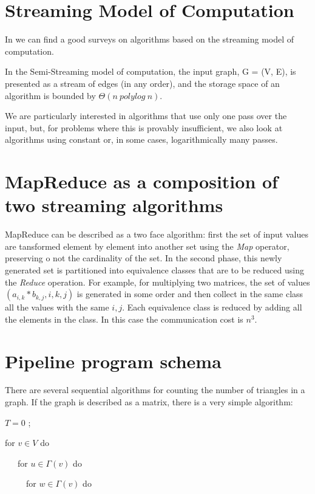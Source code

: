 \documentclass{article}                     \usepackage{graphics}
\begin{document}
\section{Streaming Model of Computation} 

In \cite{McGregor:2014:GSA:2627692.2627694,survey}  we can find a good surveys on  algorithms  based on the streaming model of computation. 

In the Semi-Streaming model of computation, the input graph,
G = (V, E), is presented as a stream of edges (in any order),
and the storage space of an algorithm is bounded by $\Theta(n  \  polylog \ n)$. 

We are particularly interested in algorithms that use
only one pass over the input, but, for problems where this is provably
insufficient, we also look at algorithms using constant or, in some cases,
logarithmically many passes. 


\section{MapReduce as a composition of two streaming algorithms}\label{CTMapReduce}

MapReduce can be described as a two face algorithm: first the set of input values are tansformed element by element into another set using the \textit{Map} operator,  preserving o not the cardinality of the set. In the second phase, this newly generated set is partitioned into equivalence classes  that are to be reduced using the \textit{Reduce} operation.  For example, for multiplying two matrices, the set of values $ (a_{i,k} * b_{k,j}, i,k,j)$ is generated in some order and then collect in the same class all the values with the same $i,j$.  Each equivalence class is reduced by adding all the elements in the class. In this case the communication cost is $n^3$.

\section{Pipeline program schema}
There are several sequential algorithms  for counting the number of triangles in a graph. If the graph is described as a matrix, there is a very simple algorithm: 


$T = 0$ ;

for $v \in  V$ do

\ \ \ for $u \in \Gamma(v)$ do

\ \ \ \ \ for $w   \in \Gamma(v)$ do
\end{document}
